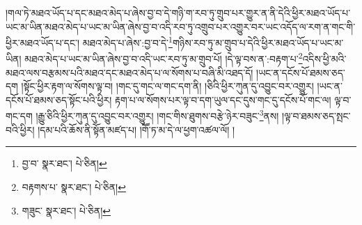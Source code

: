 །གལ་ཏེ་མཐའ་ཡོད་པ་དང་མཐའ་མེད་པ་ཞེས་བྱ་བ་དེ་གཉི་ག་རབ་ཏུ་གྲུབ་པར་གྱུར་ན་ནི་དེའི་ཕྱིར་མཐའ་ཡོད་པ་ཡང་མ་ཡིན་མཐའ་མེད་པ་ཡང་མ་ཡིན་ཞེས་བྱ་བ་འདི་རབ་ཏུ་འགྲུབ་པར་འགྱུར་བར་ཡང་འདོད་ལ་རག་ན་གང་གི་ཕྱིར་མཐའ་ཡོད་པ་དང་། མཐའ་མེད་པ་ཞེས་:བྱ་བ་དེ་\footnote{བྱ་བ་  སྣར་ཐང་།  པེ་ཅིན། }གཉིས་རབ་ཏུ་མ་གྲུབ་པ་དེའི་ཕྱིར་མཐའ་ཡོད་པ་ཡང་མ་ཡིན། མཐའ་མེད་པ་ཡང་མ་ཡིན་ཞེས་བྱ་བ་འདི་ཡང་རབ་ཏུ་མ་གྲུབ་པོ། །དེ་ལྟ་བས་ན་:བརྟག་པ་\footnote{བརྟགས་པ་  སྣར་ཐང་།  པེ་ཅིན། }འདིས་ཕྱི་མའི་མཐའ་ལས་བརྩམས་པའི་མཐའ་དང་མཐའ་མེད་པ་ལ་སོགས་པ་བཞི་མི་འཐད་དོ། །ཡང་ན་དངོས་པོ་ཐམས་ཅད་དག །སྟོང་ཕྱིར་རྟག་ལ་སོགས་ལྟ་བ། །གང་དུ་གང་ལ་གང་དག་ནི། །ཅིའི་ཕྱིར་ཀུན་དུ་འབྱུང་བར་འགྱུར། །ཡང་ན་དངོས་པོ་ཐམས་ཅད་སྟོང་པའི་ཕྱིར། རྟག་པ་ལ་སོགས་པར་ལྟ་བ་དག་ཡུལ་དང་དུས་གང་དུ་དངོས་པོ་གང་ལ། ལྟ་བ་གང་དག །རྒྱུ་ཅིའི་ཕྱིར་ཀུན་དུ་འབྱུང་བར་འགྱུར། །གང་གིས་ཐུགས་བརྩེ་ཉེར་བཟུང་\footnote{གཟུང་  སྣར་ཐང་།  པེ་ཅིན། }ནས། །ལྟ་བ་ཐམས་ཅད་སྤང་བའི་ཕྱིར། །དམ་པའི་ཆོས་ནི་སྟོན་མཛད་པ། །གཽ་ཏ་མ་དེ་ལ་ཕྱག་འཚལ་ལོ། །
